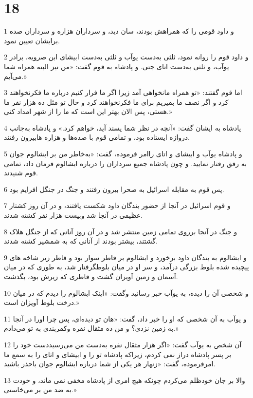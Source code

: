 \chapter{18}

\par 1 و داود قومی را که همراهش بودند، سان دید، و سرداران هزاره و سرداران صده برایشان تعیین نمود.
\par 2 و داود قوم را روانه نمود، ثلثی به‌دست یوآب و ثلثی به‌دست ابیشای ابن صرویه، برادر یوآب، و ثلثی به‌دست اتای جتی. و پادشاه به قوم گفت: «من نیز البته همراه شما می‌آیم.»
\par 3 اما قوم گفتند: «تو همراه مانخواهی آمد زیرا اگر ما فرار کنیم درباره ما فکرنخواهند کرد و اگر نصف ما بمیریم برای ما فکرنخواهند کرد و حال تو مثل ده هزار نفر ما هستی، پس الان بهتر این است که ما را از شهر امداد کنی.»
\par 4 پادشاه به ایشان گفت: «آنچه در نظر شما پسند آید، خواهم کرد.» و پادشاه به‌جانب دروازه ایستاده بود، و تمامی قوم با صده‌ها و هزاره هابیرون رفتند.
\par 5 و پادشاه یوآب و ابیشای و اتای راامر فرموده، گفت: «به‌خاطر من بر ابشالوم جوان به رفق رفتار نمایید. و چون پادشاه جمیع سرداران را درباره ابشالوم فرمان داد، تمامی قوم شنیدند.
\par 6 پس قوم به مقابله اسرائیل به صحرا بیرون رفتند و جنگ در جنگل افرایم بود.
\par 7 و قوم اسرائیل در آنجا از حضور بندگان داود شکست یافتند، و در آن روز کشتار عظیمی در آنجا شد وبیست هزار نفر کشته شدند.
\par 8 و جنگ در آنجا برروی تمامی زمین منتشر شد و در آن روز آنانی که از جنگل هلاک گشتند، بیشتر بودند از آنانی که به شمشیر کشته شدند.
\par 9 و ابشالوم به بندگان داود برخورد و ابشالوم بر قاطر سوار بود و قاطر زیر شاخه های پیچیده شده بلوط بزرگی درآمد، و سر او در میان بلوطگرفتار شد، به طوری که در میان آسمان و زمین آویزان گشت و قاطری که زیرش بود، بگذشت.
\par 10 و شخصی آن را دیده، به یوآب خبر رسانید وگفت: «اینک ابشالوم را دیدم که در میان درخت بلوط آویزان است.»
\par 11 و یوآب به آن شخصی که او را خبر داد، گفت: «هان تو دیده‌ای، پس چرا اورا در آنجا به زمین نزدی؟ و من ده مثقال نقره وکمربندی به تو می‌دادم.»
\par 12 آن شخص به یوآب گفت: «اگر هزار مثقال نقره به‌دست من می‌رسیددست خود را بر پسر پادشاه دراز نمی کردم، زیراکه پادشاه تو را و ابیشای و اتای را به سمع ما امرفرموده، گفت: «زنهار هر یکی از شما درباره ابشالوم جوان باحذر باشید.
\par 13 والا بر جان خودظلم می‌کردم چونکه هیچ امری از پادشاه مخفی نمی ماند، و خودت به ضد من بر می‌خاستی.»

